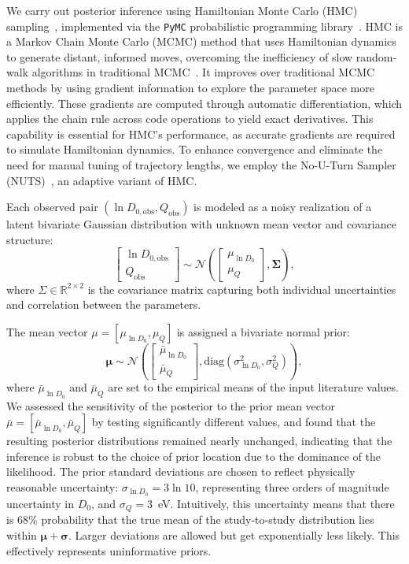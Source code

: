\documentclass[%
preprint,
amsmath,amssymb,
aps,
]{revtex4-2}
\newcommand{\?}{\stackrel{?}{=}}
\begin{document}
We carry out posterior inference using Hamiltonian Monte Carlo (HMC) sampling~\cite{HMC1,HMC2}, implemented via the \verb|PyMC| probabilistic programming library~\cite{PyMC}. HMC is a Markov Chain Monte Carlo (MCMC) method that uses Hamiltonian dynamics to generate distant, informed moves, overcoming the inefficiency of slow random-walk algorithms in traditional MCMC~\cite{Neal2011}. It improves over traditional MCMC methods by using gradient information to explore the parameter space more efficiently. These gradients are computed through automatic differentiation, which applies the chain rule across code operations to yield exact derivatives. This capability is essential for HMC's performance, as accurate gradients are required to simulate Hamiltonian dynamics. To enhance convergence and eliminate the need for manual tuning of trajectory lengths, we employ the No-U-Turn Sampler (NUTS)~\cite{NUTS}, an adaptive variant of HMC.

Each observed pair $(\ln D_{0,\text{obs}}, Q_{\text{obs}})$ is modeled as a noisy realization of a latent bivariate Gaussian distribution with unknown mean vector and covariance structure:
\begin{equation}
\begin{bmatrix}
\ln D_{0,\text{obs}} \\
Q_{\text{obs}}
\end{bmatrix}
\sim \mathcal{N}
\left(
\begin{bmatrix}
\mu_{\ln D_0} \\
\mu_Q
\end{bmatrix},
\boldsymbol{\Sigma}
\right),
\end{equation}
where $\Sigma \in \mathbb{R}^{2\times2}$ is the covariance matrix capturing both individual uncertainties and correlation between the parameters.

The mean vector $\mu = [\mu_{\ln D_0}, \mu_Q]$ is assigned a bivariate normal prior:
\begin{equation}
\boldsymbol{\mu} \sim \mathcal{N} \left(
\begin{bmatrix}
\bar{\mu}_{\ln D_0} \\
\bar{\mu}_Q
\end{bmatrix},
\mathrm{diag}(\sigma_{\ln D_0}^2, \sigma_Q^2)
\right),
\end{equation}
where $\bar{\mu}_{\ln D_0}$ and $\bar{\mu}_Q$ are set to the empirical means of the input literature values. We assessed the sensitivity of the posterior to the prior mean vector $\bar{\mu} = [\bar{\mu}_{\ln D_0}, \bar{\mu}_Q]$ by testing significantly different values, and found that the resulting posterior distributions remained nearly unchanged, indicating that the inference is robust to the choice of prior location due to the dominance of the likelihood. The prior standard deviations are chosen to reflect physically reasonable uncertainty: $\sigma_{\ln D_0} = 3 \ln 10$, representing three orders of magnitude uncertainty in $D_0$, and $\sigma_Q = 3$~eV. Intuitively, this uncertainty means that there is 68\% probability that the true mean of the study‑to‑study distribution lies within $\boldsymbol{\mu} + \boldsymbol{\sigma}$. Larger deviations are allowed but get exponentially less likely. This effectively represents uninformative priors.
\end{document}
